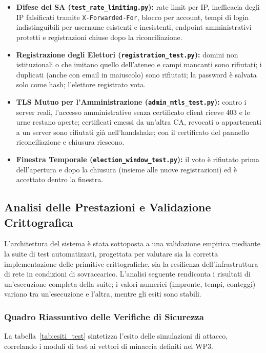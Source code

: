\documentclass[12pt,a4paper]{article}
\begin{document}
\begin{itemize}
  \item \textbf{Difese del SA (\texttt{test\_rate\_limiting.py}):} rate limit per IP, inefficacia degli IP falsificati tramite \texttt{X-Forwarded-For}, blocco per account, tempi di login indistinguibili per username esistenti e inesistenti, endpoint amministrativi protetti e registrazioni chiuse dopo la riconciliazione.
  \item \textbf{Registrazione degli Elettori (\texttt{registration\_test.py}):} domini non istituzionali o che imitano quello dell'ateneo e campi mancanti sono rifiutati; i duplicati (anche con email in maiuscolo) sono rifiutati; la password è salvata solo come hash; l'elettore registrato vota.
  \item \textbf{TLS Mutuo per l'Amministrazione (\texttt{admin\_mtls\_test.py}):} contro i server reali, l'accesso amministrativo senza certificato client riceve 403 e le urne restano aperte; certificati emessi da un'altra CA, revocati o appartenenti a un server sono rifiutati già nell'handshake; con il certificato del pannello riconciliazione e chiusura riescono.
  \item \textbf{Finestra Temporale (\texttt{election\_window\_test.py}):} il voto è rifiutato prima dell'apertura e dopo la chiusura (insieme alle nuove registrazioni) ed è accettato dentro la finestra.
\end{itemize}

\subsection{Analisi delle Prestazioni e Validazione Crittografica}

L'architettura del sistema è stata sottoposta a una validazione empirica mediante la suite di test automatizzati, progettata per valutare sia la corretta implementazione delle primitive crittografiche, sia la resilienza dell'infrastruttura di rete in condizioni di sovraccarico. L'analisi seguente rendiconta i risultati di un'esecuzione completa della suite; i valori numerici (impronte, tempi, conteggi) variano tra un'esecuzione e l'altra, mentre gli esiti sono stabili.

\subsubsection{Quadro Riassuntivo delle Verifiche di Sicurezza}

La tabella~\ref{tab:esiti_test} sintetizza l'esito delle simulazioni di attacco, correlando i moduli di test ai vettori di minaccia definiti nel WP3.
\end{document}
